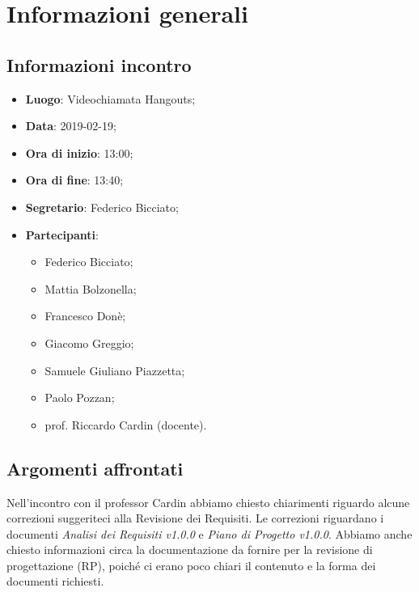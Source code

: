 \section{Informazioni generali}

\subsection{Informazioni incontro}
\begin{itemize}
	\item \textbf{Luogo}: Videochiamata Hangouts;
	\item \textbf{Data}: 2019-02-19;
	\item \textbf{Ora di inizio}: 13:00;
	\item \textbf{Ora di fine}: 13:40;
	\item \textbf{Segretario}: Federico Bicciato;
	\item \textbf{Partecipanti}:
	\begin{itemize}
		\item Federico Bicciato;
		\item Mattia Bolzonella;
		\item Francesco Donè;
		\item Giacomo Greggio;
		\item Samuele Giuliano Piazzetta;
		\item Paolo Pozzan;
		\item prof. Riccardo Cardin (docente).	
	\end{itemize}
\end{itemize}

\subsection{Argomenti affrontati}
Nell'incontro con il professor Cardin abbiamo chiesto chiarimenti riguardo alcune correzioni suggeriteci alla Revisione dei Requisiti. Le correzioni riguardano i documenti \textit{Analisi dei Requisiti v1.0.0} e \textit{Piano di Progetto v1.0.0}.
Abbiamo anche chiesto informazioni circa la documentazione da fornire per la revisione di progettazione (RP), poiché ci erano poco chiari il contenuto e la forma dei documenti richiesti.
